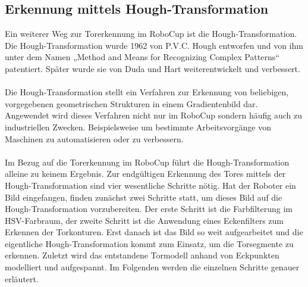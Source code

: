 \documentclass[a4paper,12pt]{article}
\begin{document}
\subsection{Erkennung mittels Hough-Transformation}
Ein weiterer Weg zur Torerkennung im RoboCup ist die Hough-Transformation.
Die Hough-Transformation wurde 1962 von P.V.C. Hough entworfen und von ihm unter dem Namen
„Method and Means for Recognizing Complex Patterns“ patentiert. Später wurde sie von Duda und Hart 
weiterentwickelt und verbessert. \\
\\
Die Hough-Transformation stellt ein Verfahren zur Erkennung von beliebigen, vorgegebenen
geometrischen Strukturen in einem Gradientenbild dar. Angewendet wird dieses Verfahren
nicht nur im RoboCup sondern häufig auch zu industriellen Zwecken. Beispielsweise um bestimmte 
Arbeitsvorgänge von Maschinen zu automatisieren oder zu verbessern. \\
\\
Im Bezug auf die Torerkennung im RoboCup führt die Hough-Transformation alleine zu keinem
Ergebnis. Zur endgültigen Erkennung des Tores mittels der Hough-Transformation sind vier
wesentliche Schritte nötig. Hat der Roboter ein Bild eingefangen, finden zunächst zwei
Schritte statt, um dieses Bild auf die Hough-Transformation vorzubereiten. Der erste Schritt
ist die Farbfilterung im HSV-Farbraum, der zweite Schritt ist die Anwendung eines
Eckenfilters zum Erkennen der Torkonturen. Erst danach ist das Bild so weit aufgearbeitet und die
eigentliche Hough-Transformation kommt zum Einsatz, um die Torsegmente zu erkennen. Zuletzt wird
das entstandene Tormodell anhand von Eckpunkten modelliert und aufgespannt. Im Folgenden werden die 
einzelnen Schritte genauer erläutert.
\end{document}
